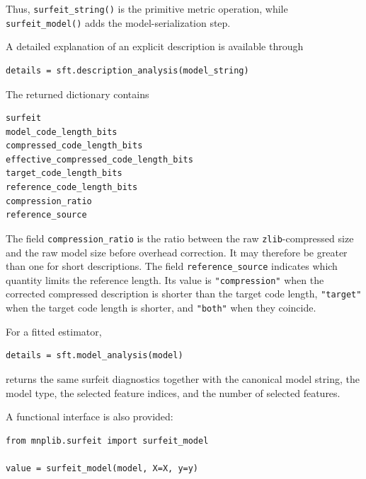 Thus, \texttt{surfeit\_string()} is the primitive metric operation, while \texttt{surfeit\_model()} adds the model-serialization step.

A detailed explanation of an explicit description is available through

\begin{sourcecode}
{\scriptsize
\begin{verbatim}
details = sft.description_analysis(model_string)
\end{verbatim}
}
\end{sourcecode}

The returned dictionary contains

\begin{sourcecode}
{\scriptsize
\begin{verbatim}
surfeit
model_code_length_bits
compressed_code_length_bits
effective_compressed_code_length_bits
target_code_length_bits
reference_code_length_bits
compression_ratio
reference_source
\end{verbatim}
}
\end{sourcecode}

The field \texttt{compression\_ratio} is the ratio between the raw \texttt{zlib}-compressed size and the raw model size before overhead correction. It may therefore be greater than one for short descriptions. The field \texttt{reference\_source} indicates which quantity limits the reference length. Its value is \texttt{"compression"} when the corrected compressed description is shorter than the target code length, \texttt{"target"} when the target code length is shorter, and \texttt{"both"} when they coincide.

For a fitted estimator,

\begin{sourcecode}
{\scriptsize
\begin{verbatim}
details = sft.model_analysis(model)
\end{verbatim}
}
\end{sourcecode}

returns the same surfeit diagnostics together with the canonical model string, the model type, the selected feature indices, and the number of selected features.

A functional interface is also provided:

\begin{sourcecode}
{\scriptsize
\begin{verbatim}
from mnplib.surfeit import surfeit_model

value = surfeit_model(model, X=X, y=y)
\end{verbatim}
}
\end{sourcecode}

